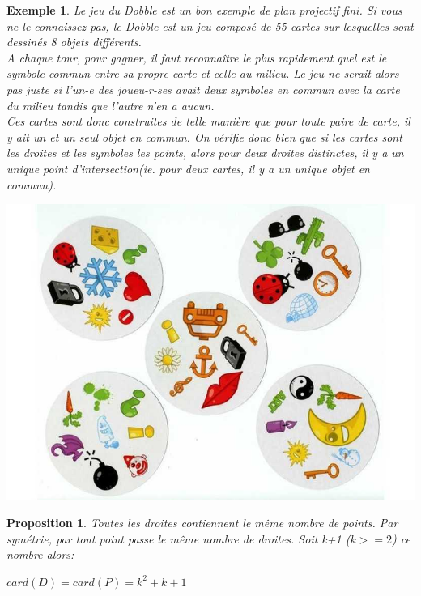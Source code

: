 \documentclass[a4paper]{article}
\newtheorem{Ex}{Exemple}[subsection]
\newtheorem{Prop}[Def]{Proposition}
\begin{document}
\begin{Ex}
  Le jeu du Dobble est un bon exemple de plan projectif fini. Si vous ne le connaissez pas, le Dobble est un jeu composé de 55 cartes sur lesquelles sont dessinés 8 objets\vspace{1\baselineskip} différents.\\
  A chaque tour, pour gagner, il faut reconnaître le plus rapidement quel est le symbole commun entre sa propre carte et celle au milieu. Le jeu ne serait alors pas juste si l'un-e des joueu-r-ses avait deux symboles en commun avec la carte du milieu tandis que l'autre n'en\vspace{1\baselineskip} a aucun. \\
 Ces cartes sont donc construites de telle manière que pour toute paire de carte, il y ait un et un seul objet en commun. On vérifie donc bien que si les cartes sont les droites et les symboles les points, alors pour deux droites distinctes, il y a un unique point d'intersection(ie. pour deux cartes, il y a un unique objet en comm\vspace{1\baselineskip}un).\\
 
\begin{center}
\includegraphics[scale=0.3]{dobble-2.jpg}
\end{center}
\end{Ex}
\begin{Prop}
Toutes les droites contiennent le même nombre de points. Par symétrie, par tout point passe le même nombre de droites. Soit k+1 ($k>=2$) ce nombre alors:
\begin{center}
$card(D)=card(P)=k^2+k+1$
\end{center}
\end{Prop}
\end{document}
